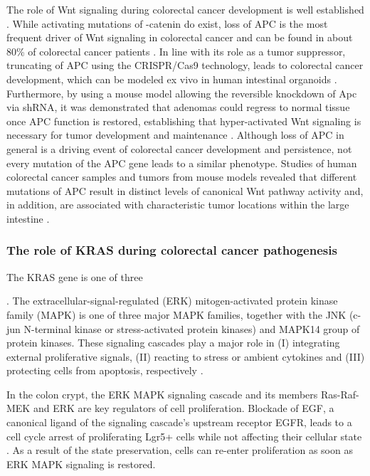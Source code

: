 \begin{flushleft}
The role of Wnt signaling during colorectal cancer development is well established \cite{Polakis2007}. While activating mutations of \textbeta-catenin do exist, loss of APC is the most frequent driver of Wnt signaling in colorectal cancer and can be found in about 80\% of colorectal cancer patients \cite{Fearon1989}. In line with its role as a tumor suppressor, truncating of APC using the CRISPR/Cas9 technology, leads to colorectal cancer development, which can be modeled ex vivo in human intestinal organoids \cite{Matano2015, Drost2015SequentialCells}. Furthermore, by using a mouse model allowing the reversible knockdown of Apc via shRNA, it was demonstrated that adenomas could regress to normal tissue once APC function is restored, establishing that hyper-activated Wnt signaling is necessary for tumor development and maintenance \cite{Dow2015}. 
Although loss of APC in general is a driving event of colorectal cancer development and persistence, not every mutation of the APC gene leads to a similar phenotype. Studies of human colorectal cancer samples and tumors from mouse models revealed that different mutations of APC result in distinct levels of canonical Wnt pathway activity and, in addition, are associated with characteristic tumor locations within the large intestine \cite{Christie2013, Buchert2010}. \par

\subsubsection{The role of KRAS during colorectal cancer pathogenesis}

The KRAS gene is one of three

. The extracellular-signal-regulated (ERK) mitogen-activated protein kinase family (MAPK) is one of three major MAPK families, together with the JNK (c-jun N-terminal kinase or stress-activated protein kinases) and MAPK14 group of protein kinases. These signaling cascades play a major role in (I) integrating external proliferative signals, (II) reacting to stress or ambient cytokines and (III) protecting cells from apoptosis, respectively \cite{Oncol2005}. 

In the colon crypt, the ERK MAPK signaling cascade and its members Ras-Raf-MEK and ERK are key regulators of cell proliferation. Blockade of EGF, a canonical ligand of the signaling cascade's upstream receptor EGFR, leads to a cell cycle arrest of proliferating Lgr5+ cells while not affecting their cellular state \cite{basakInducedQuiescenceLgr52017a}. As a result of the state preservation, cells can re-enter proliferation as soon as ERK MAPK signaling is restored.


\end{flushleft}
